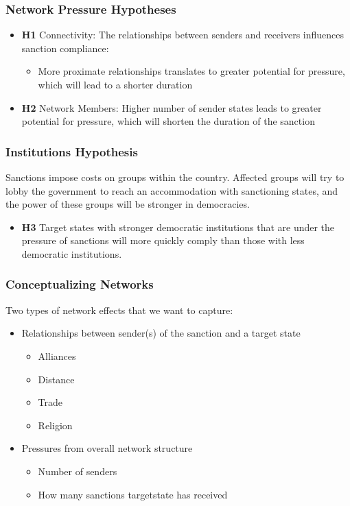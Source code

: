 \documentclass{beamer}
\begin{document}

\begin{frame}
\frametitle{Network Pressure Hypotheses}
\begin{itemize}
		\item \textbf{H1} Connectivity: The relationships between senders and receivers influences sanction compliance: 
		\begin{itemize}
			\item More proximate relationships translates to greater potential for pressure, which will lead to a shorter duration
		\end{itemize}
		\item \textbf{H2} Network Members: Higher number of sender states leads to greater potential for pressure, which will shorten the duration of the sanction 
\end{itemize} 
\end{frame}

\begin{frame}
\frametitle{Institutions Hypothesis}
	Sanctions impose costs on groups within the country. Affected groups will try to lobby the government to reach an accommodation with sanctioning states, and the power of these groups will be stronger in democracies.
	\begin{itemize}
	\item \textbf{H3} Target states with stronger democratic institutions that are under the pressure of sanctions will more quickly comply than those with less democratic institutions. 
\end{itemize}
\end{frame}

\begin{frame}
\frametitle{Conceptualizing Networks}

Two types of network effects that we want to capture:

\begin{itemize}
	\item Relationships between sender(s) of the sanction and a target state
	\begin{itemize}
		\item Alliances
		\item Distance
		\item Trade
		\item Religion
	\end{itemize}
	\item Pressures from overall network structure
	\begin{itemize}
		\item Number of senders
		\item How many sanctions targetstate has received
	\end{itemize}
\end{itemize}

\end{frame}
\end{document}

